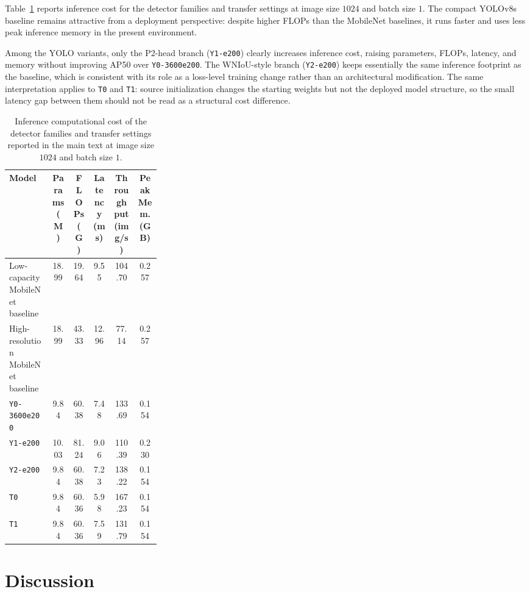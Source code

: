 \documentclass[10pt,a4paper]{article}
\begin{document}
Table~\ref{tab:efficiency} reports inference cost for the detector families and transfer settings at image size $1024$ and batch size $1$. The compact YOLOv8s baseline remains attractive from a deployment perspective: despite higher FLOPs than the MobileNet baselines, it runs faster and uses less peak inference memory in the present environment.

Among the YOLO variants, only the P2-head branch (\texttt{Y1-e200}) clearly increases inference cost, raising parameters, FLOPs, latency, and memory without improving AP50 over \texttt{Y0-3600e200}. The WNIoU-style branch (\texttt{Y2-e200}) keeps essentially the same inference footprint as the baseline, which is consistent with its role as a loss-level training change rather than an architectural modification. The same interpretation applies to \texttt{T0} and \texttt{T1}: source initialization changes the starting weights but not the deployed model structure, so the small latency gap between them should not be read as a structural cost difference.

\begin{table}[t]
  \centering
  \caption{Inference computational cost of the detector families and transfer settings reported in the main text at image size $1024$ and batch size $1$.}
  \label{tab:efficiency}
  \footnotesize
  \setlength{\tabcolsep}{4pt}
  \begin{tabularx}{\linewidth}{>{\raggedright\arraybackslash}p{0.29\linewidth} c c c c c}
    \toprule
    Model & Params (M) & FLOPs (G) & Latency (ms) & Throughput (img/s) & Peak Mem. (GB) \\
    \midrule
    Low-capacity MobileNet baseline & 18.99 & 19.64 & 9.55 & 104.70 & 0.257 \\
    High-resolution MobileNet baseline & 18.99 & 43.33 & 12.96 & 77.14 & 0.257 \\
    \texttt{Y0-3600e200} & 9.84 & 60.38 & 7.48 & 133.69 & 0.154 \\
    \texttt{Y1-e200} & 10.03 & 81.24 & 9.06 & 110.39 & 0.230 \\
    \texttt{Y2-e200} & 9.84 & 60.38 & 7.23 & 138.22 & 0.154 \\
    \texttt{T0} & 9.84 & 60.36 & 5.98 & 167.23 & 0.154 \\
    \texttt{T1} & 9.84 & 60.36 & 7.59 & 131.79 & 0.154 \\
    \bottomrule
  \end{tabularx}
\end{table}

\section{Discussion}
\label{sec:discussion}
\end{document}

